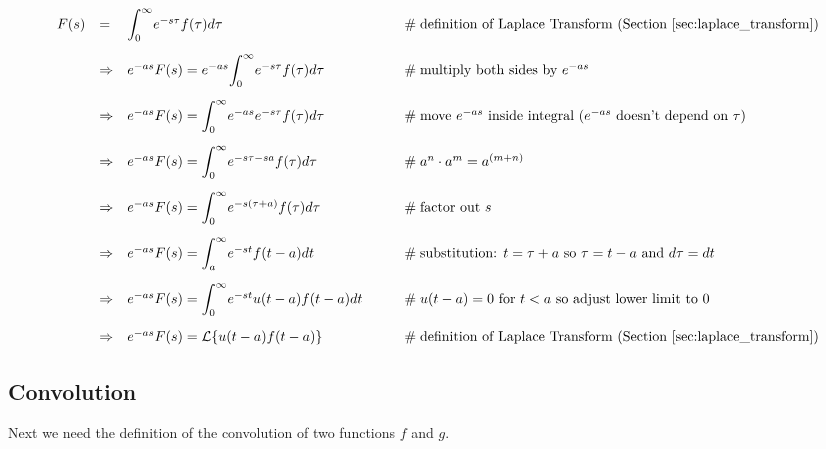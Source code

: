 \documentclass{article}
\theoremstyle{definition}
\begin{document}
\begin{equation*}
\begin{array}{lllll}
F(s)
&=& \mathlarger{\int}_0^\infty e^{-s\tau} f(\tau) d\tau                                                       &\qquad \mathrel{\#} \text{definition of Laplace Transform (Section \ref{sec:laplace_transform})}    \\
[15pt]
&\Rightarrow& e^{-as} F(s) = e^{-as} \mathlarger{\int}_0^\infty e^{-s\tau} f(\tau) d\tau    &\qquad \mathrel{\#} \text{multiply both sides by $e^{-as}$}                                                              \\
[15pt]
&\Rightarrow& e^{-as} F(s) = \mathlarger{\int}_0^\infty e^{-as} e^{-s\tau} f(\tau) d\tau    &\qquad \mathrel{\#} \text{move $e^{-as}$ inside integral ($e^{-as}$ doesn't depend on $\tau$)}    \\
[15pt]
&\Rightarrow& e^{-as} F(s) = \mathlarger{\int}_0^\infty e^{-s\tau - sa} f(\tau) d\tau         &\qquad \mathrel{\#} a^n \cdot a^m = a^{(m+n)}                                                                                 \\
[15pt]
&\Rightarrow& e^{-as} F(s) = \mathlarger{\int}_0^\infty e^{-s(\tau+a)} f(\tau) d\tau         &\qquad \mathrel{\#} \text{factor out $s$}                                                                                            \\
[15pt]
&\Rightarrow& e^{-as} F(s) = \mathlarger{\int}_a^\infty e^{-st} f(t-a) dt                           &\qquad \mathrel{\#} \text{substitution: $t = \tau + a$ so $\tau = t - a$ and $d\tau = dt$}                   \\
[15pt]
&\Rightarrow& e^{-as} F(s) = \mathlarger{\int}_0^\infty e^{-st} u(t-a) f(t-a) dt                 &\qquad \mathrel{\#} \text{$u(t-a) = 0$ for $t < a$ so adjust lower limit to 0}                                       \\
[15pt]
&\Rightarrow& e^{-as} F(s) = \mathcal{L}\{u(t-a) f(t-a)\}                                                 &\qquad \mathrel{\#} \text{definition of Laplace Transform (Section \ref{sec:laplace_transform})}       \\
\end{array}
\end{equation*}


\bigskip
\subsection{Convolution}
\label{sec:convolution}
Next we need the definition of the convolution of two functions
$f$ and $g$. 
\end{document}
